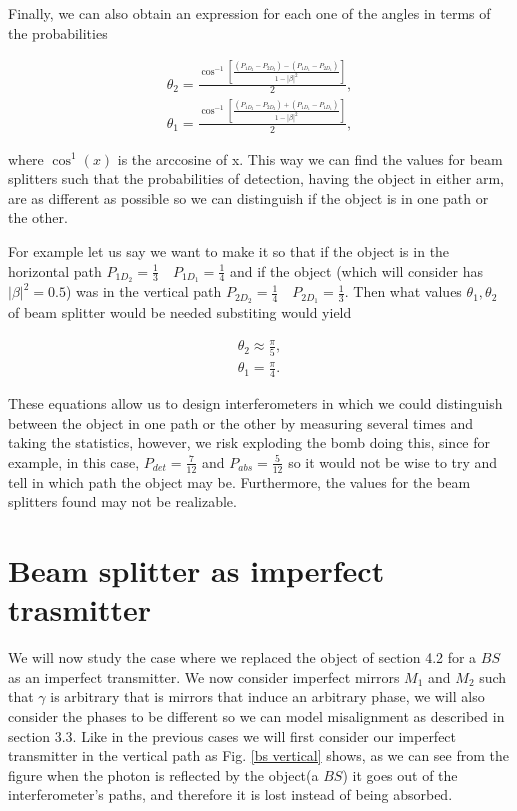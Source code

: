 \documentclass{book}
\begin{document}
Finally, we can also obtain an expression for each one of the angles in terms of the probabilities


\begin{align}
\theta_{2}=\displaystyle \frac{\cos^{-1}\left[\frac{(P_{1D_{2}}-P_{2D_{2}})-(P_{1D_{1}}-P_{2D_{1}})}{1-|\beta|^2}\right]}{2},\\
\theta_{1}=\displaystyle \frac{\cos^{-1}\left[\frac{(P_{1D_{2}}-P_{2D_{2}})+(P_{1D_{1}}-P_{1D_{1}})}{1-|\beta|^2}\right]}{2},
\end{align}


where $\cos^{1}(x)$ is the arccosine of x. This way we can find the values for beam splitters such that the probabilities of detection, having the object in either arm, are as different as possible so we can distinguish if the object is in one path or the other.

For example let us say we want to make it so that if the object is in the horizontal path $P_{1D_{2}}=\frac{1}{3} \quad P_{1D_{1}}=\frac{1}{4}$  and  if the object (which will consider has $|\beta|^{2}=0.5$) was in the vertical path $P_{2D_{2}}=\frac{1}{4} \quad P_{2D_{1}}=\frac{1}{3}$. Then what values $\theta_{1},\theta_{2}$ of beam splitter would be needed substiting would yield

\begin{align*}
\theta_{2} \approx \frac{\pi}{5},\\
\theta_{1} = \frac{\pi}{4}.
\end{align*}

These equations allow us to design interferometers in which we could distinguish between the object in one path or the other by measuring several times and taking the statistics, however, we risk exploding the bomb doing this, since for example, in this case, $P_{det}=\frac{7}{12}$ and $P_{abs}=\frac{5}{12}$ so it would not be wise to try and tell in which path the object may be. Furthermore, the values for the beam splitters found may not be realizable.
 

\pagebreak


\section[BS as imperfect transmitter]{Beam splitter as imperfect trasmitter}

We will now study the case where we replaced the object of section 4.2 for a $BS$ as an imperfect transmitter. We now consider imperfect mirrors $M_{1}$ and $M_{2}$ such that $\gamma$ is arbitrary that is mirrors that induce an arbitrary phase, we will also consider the phases to be different so we can model misalignment as described in section 3.3.  Like in the previous cases we will first consider our imperfect transmitter in the vertical path as Fig. \ref{bs vertical} shows, as we can see from the figure when the photon is reflected by the object(a $BS$) it goes out of the interferometer's paths, and therefore it is lost instead of being absorbed.
\end{document}
